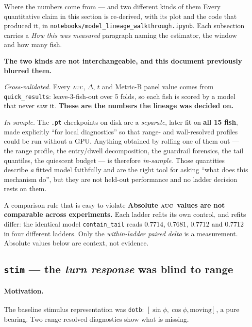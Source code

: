 \documentclass[11pt,a4paper]{article}
\newcommand{\auc}{\textsc{auc}}
\newcommand{\code}[1]{\texttt{\small #1}}
\begin{document}
\begin{keybox}{Where the numbers come from --- and two different kinds of them}
Every quantitative claim in this section is re-derived, with its plot and the code that
produced it, in \code{notebooks/model\_lineage\_walkthrough.ipynb}. Each subsection carries
a \emph{How this was measured} paragraph naming the estimator, the window and how many fish.

\medskip
\textbf{The two kinds are not interchangeable, and this document previously blurred them.}

\emph{Cross-validated.} Every \auc, $\Delta$, $t$ and Metric-B panel value comes from
\code{quick\_results}: leave-3-fish-out over 5 folds, so each fish is scored by a model that
never saw it. \textbf{These are the numbers the lineage was decided on.}

\emph{In-sample.} The \code{.pt} checkpoints on disk are a \emph{separate}, later fit on
\textbf{all 15 fish}, made explicitly ``for local diagnostics'' so that range- and
wall-resolved profiles could be run without a GPU. Anything obtained by rolling one of them
out --- the range profile, the entry/dwell decomposition, the guardrail forensics, the tail
quantiles, the quiescent budget --- is therefore \emph{in-sample}. Those quantities describe
\emph{a} fitted model faithfully and are the right tool for asking ``what does this mechanism
do'', but they are not held-out performance and no ladder decision rests on them.
\end{keybox}

\begin{keybox}{A comparison rule that is easy to violate}
\textbf{Absolute \auc\ values are not comparable across experiments.} Each ladder refits
its own control, and refits differ: the identical model \code{contain\_tail} reads
$0.7714$, $0.7681$, $0.7712$ and $0.7712$ in four different ladders. Only the
\emph{within-ladder paired delta} is a measurement. Absolute values below are context,
not evidence.
\end{keybox}

\subsection{\texttt{stim} --- the \emph{turn response} was blind to range}\label{sec:stim}

\paragraph{Motivation.}
The baseline stimulus representation was \code{dotb}: $[\sin\phi, \cos\phi,
\text{moving}]$, a pure bearing. Two range-resolved diagnostics show what is missing.
\end{document}

